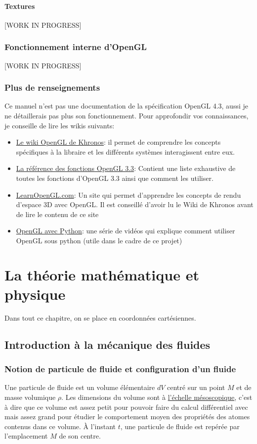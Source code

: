 \documentclass[a4paper,10pt]{report}
\begin{document}
\subsubsection{Textures}
[WORK IN PROGRESS]

\subsection{Fonctionnement interne d'OpenGL}
[WORK IN PROGRESS]

\subsection{Plus de renseignements}
Ce manuel n'est pas une documentation de la spécification OpenGL 4.3, aussi je ne détaillerais pas plus son fonctionnement. Pour approfondir vos connaissances, je conseille de lire les wikis suivants:
\begin{itemize}
 \item \href{https://www.khronos.org/opengl/wiki/}{Le wiki OpenGL de Khronos}: il permet de comprendre les concepts spécifiques à la libraire et les différents systèmes interagissent entre eux.
 \item \href{http://www.hyzgame.org.cn/OpenGL/man3/bottom.php}{La référence des fonctions OpenGL 3.3}: Contient une liste exhaustive de toutes les fonctions d'OpenGL 3.3 ainsi que comment les utiliser.
 \item \href{https://learnopengl.com}{LearnOpenGL.com}: Un site qui permet d'apprendre les concepts de rendu d'espace 3D avec OpenGL. Il est conseillé d'avoir lu le Wiki de Khronos avant de lire le contenu de ce site
 \item \href{https://www.youtube.com/playlist?list=PLn3eTxaOtL2PDnEVNwOgZFm5xYPr4dUoR}{OpenGL avec Python}: une série de vidéos qui explique comment utiliser OpenGL sous python (utile dans le cadre de ce projet)
\end{itemize}


\chapter{La théorie mathématique et physique}
Dans tout ce chapitre, on se place en coordonnées cartésiennes.
\section{Introduction à la mécanique des fluides}
\subsection{Notion de particule de fluide et configuration d'un fluide}
Une particule de fluide est un volume élémentaire $dV$ centré sur un point $M$ et de masse volumique $\rho$. Les dimensions du volume sont à \href{https://fr.wikipedia.org/wiki/Mésoscopique}{l'échelle mésoscopique}, c'est à dire que ce volume est assez petit pour pouvoir faire du calcul différentiel avec mais assez grand pour étudier le comportement moyen des propriétés des atomes contenus dans ce volume.
À l'instant $t$, une particule de fluide est repérée par l'emplacement $M$ de son centre.
\end{document}
